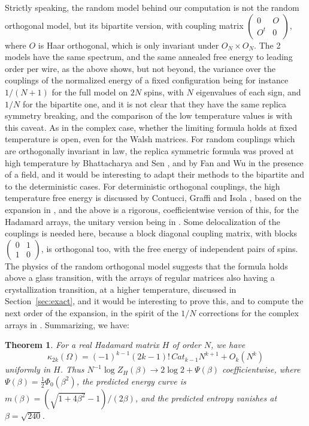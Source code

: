 \documentclass[11pt,a4paper]{article}
\newtheorem{thm}{Theorem}[section]
\theoremstyle{remark}
\begin{document}
Strictly speaking, the random model behind our computation is not the random orthogonal model, but its bipartite version, with coupling matrix $\begin{pmatrix}0&O\\O^t&0\end{pmatrix}$, where $O$ is Haar orthogonal, which is only invariant under $O_N\times O_N$. The 2 models have the same spectrum, and the same annealed free energy to leading order per wire, as the above shows, but not beyond, the variance over the couplings of the normalized energy of a fixed configuration being for instance $1/(N+1)$ for the full model on $2N$ spins, with $N$ eigenvalues of each sign, and $1/N$ for the bipartite one, and it is not clear that they have the same replica symmetry breaking, and the comparison of the low temperature values is with this caveat. As in the complex case, whether the limiting formula holds at fixed temperature is open, even for the Walsh matrices. For random couplings which are orthogonally invariant in law, the replica symmetric formula was proved at high temperature by Bhattacharya and Sen \cite{bse}, and by Fan and Wu \cite{fwu} in the presence of a field, and it would be interesting to adapt their methods to the bipartite and to the deterministic cases. For deterministic orthogonal couplings, the high temperature free energy is discussed by Contucci, Graffi and Isola \cite{cgi}, based on the expansion in \cite{ppo}, and the above is a rigorous, coefficientwise version of this, for the Hadamard arrays, the unitary version being in \cite{cot}. Some delocalization of the couplings is needed here, because a block diagonal coupling matrix, with blocks $\begin{pmatrix}0&1\\1&0\end{pmatrix}$, is orthogonal too, with the free energy of independent pairs of spins. The physics of the random orthogonal model suggests that the formula holds above a glass transition, with the arrays of regular matrices also having a crystallization transition, at a higher temperature, discussed in Section~\ref{sec:exact}, and it would be interesting to prove this, and to compute the next order of the expansion, in the spirit of the $1/N$ corrections for the complex arrays in \cite{cot}. Summarizing, we have:

\begin{samepage}
\begin{thm}\label{thm:free}
For a real Hadamard matrix $H$ of order $N$, we have
\[
 \kappa_{2k}(\Omega)=(-1)^{k-1}(2k-1)!\,Cat_{k-1}N^{k+1}+O_k(N^k)
\]
uniformly in $H$. Thus $N^{-1}\log Z_H(\beta)\to2\log2+\Psi(\beta)$ coefficientwise, where $\Psi(\beta)=\frac{1}{2}\Phi_0(\beta^2)$, the predicted energy curve is $m(\beta)=(\sqrt{1+4\beta^2}-1)/(2\beta)$, and the predicted entropy vanishes at $\beta=\sqrt{240}$.
\end{thm}
\end{samepage}
\end{document}
